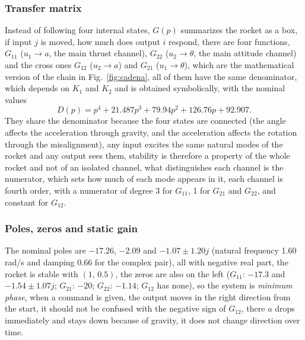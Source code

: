 \documentclass[article, 11pt]{IEEEtran}   %
\begin{document}
\subsubsection{Transfer matrix}
Instead of following four internal states, $G(p)$ summarizes the rocket as a box, if input $j$ is moved, how much does output $i$ respond, there are four functions, $G_{11}$ ($u_1\to a$, the main thrust channel), $G_{22}$ ($u_2\to\theta$, the main attitude channel) and the cross ones $G_{12}$ ($u_2\to a$) and $G_{21}$ ($u_1\to\theta$), which are the mathematical version of the chain in Fig.~\ref{fig:cadena}, all of them have the same denominator, which depends on $K_1$ and $K_2$ and is obtained symbolically, with the nominal values
\begin{equation}
D(p)=p^4+21.487p^3+79.94p^2+126.76p+92.907.
\end{equation}
They share the denominator because the four states are connected (the angle affects the acceleration through gravity, and the acceleration affects the rotation through the misalignment), any input excites the same natural modes of the rocket and any output sees them, stability is therefore a property of the whole rocket and not of an isolated channel, what distinguishes each channel is the numerator, which sets how much of each mode appears in it, each channel is fourth order, with a numerator of degree 3 for $G_{11}$, 1 for $G_{21}$ and $G_{22}$, and constant for $G_{12}$.

\subsubsection{Poles, zeros and static gain}
The nominal poles are $-17.26$, $-2.09$ and $-1.07\pm1.20j$ (natural frequency 1.60 rad/s and damping 0.66 for the complex pair), all with negative real part, the rocket is stable with $(1,\,0.5)$, the zeros are also on the left ($G_{11}$: $-17.3$ and $-1.54\pm1.07j$; $G_{21}$: $-20$; $G_{22}$: $-1.14$; $G_{12}$ has none), so the system is \emph{minimum phase}, when a command is given, the output moves in the right direction from the start, it should not be confused with the negative sign of $G_{12}$, there $a$ drops immediately and stays down because of gravity, it does not change direction over time.
\end{document}
